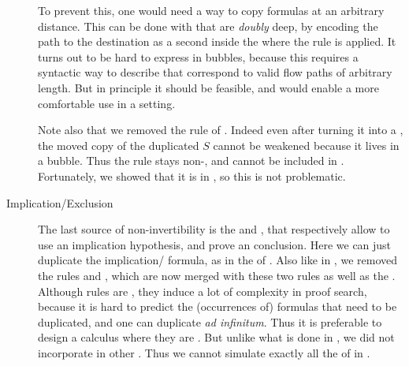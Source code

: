 \begin{scope}
\begin{description}
    To prevent this, one would need a way to copy formulas at an arbitrary
    distance. This can be done with  that are \emph{doubly}
    deep, by encoding the path to the destination as a second 
    inside the  where the rule is applied. It turns out to be hard to express in
    bubbles, because this requires a syntactic way to describe 
    that correspond to valid flow paths of arbitrary length. But in principle
    it should be feasible, and would enable a more comfortable use in a
     setting.

    Note also that we removed the  rule of .
    Indeed even after turning it into a , the moved copy of the
    duplicated  $S$ cannot be weakened because it lives in a 
    bubble. Thus the rule stays non-, and cannot be included in
    . Fortunately, we showed that it is  in
    , so this is not problematic.

  \item[Implication/Exclusion]
    The last source of non-invertibility is the 
    \kl{{\limp}{-}} and \kl{{\lsub}{+}}, that respectively allow to use an
    implication hypothesis, and prove an  conclusion.
    Here we can just duplicate the implication/ formula, as in the
     of . Also like in , we removed
    the  rules  and , which are now merged with
    these two rules as well as the . Although 
    rules are , they induce a lot of complexity in proof search,
    because it is hard to predict the (occurrences of) formulas that need to be
    duplicated, and one can duplicate \emph{ad infinitum}. Thus it is preferable
    to design a calculus where they are . But unlike what is done in
    , we did not incorporate  in other
    . Thus we cannot simulate exactly all the  of  in .


\end{description}
\end{scope}
